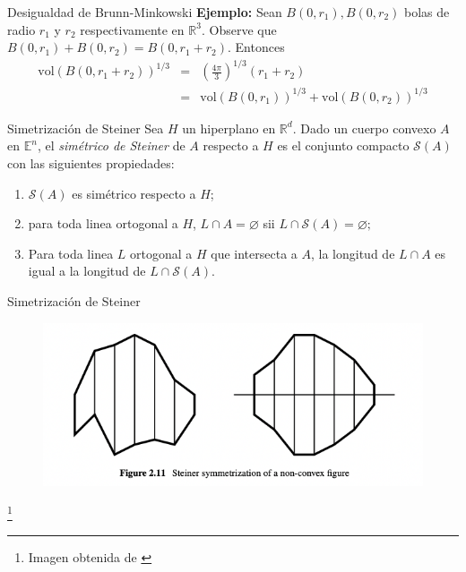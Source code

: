 \documentclass{beamer}
\newcommand\blfootnote[1]{%
  \begingroup
  \renewcommand\thefootnote{}\footnote{#1}%
  \addtocounter{footnote}{-1}%
  \endgroup
}
\newcommand{\vol}{\mathrm{vol}}
\begin{document}
\begin{frame}{Desigualdad de Brunn-Minkowski}
\textbf{Ejemplo:}
   Sean $B(0, r_1), B(0, r_2)$ bolas de radio $r_1$ y $r_2$ respectivamente en $\mathbb R^3.$ Observe que $B(0, r_1) +  B(0, r_2) = B(0, r_1 + r_2)$. Entonces
   \begin{eqnarray*}
       \vol(B(0, r_1 + r_2))^{1/3} &=& \left(\frac{4\pi}{3}\right)^{1/3} (r_1 + r_2) \\
       &=& \vol(B(0,r_1))^{1/3} + \vol(B(0, r_2))^{1/3}
   \end{eqnarray*}
   
\end{frame}

\begin{frame}{Simetrización de Steiner}
    Sea $H$ un hiperplano en $\mathbb R^d.$ Dado un cuerpo convexo $A$ en $\mathbb E^n$, el \textit{simétrico de Steiner} de $A$ respecto a $H$ es el conjunto compacto $\mathcal S(A)$ con las siguientes propiedades:
    \begin{enumerate}
        \item $\mathcal S(A)$ es simétrico respecto a $H$;
        \item para toda linea ortogonal a $H$, $L \cap A = \varnothing$ sii $L \cap \mathcal{S}(A) = \varnothing;$
        \item Para toda linea $L$ ortogonal a $H$ que intersecta a $A$, la longitud de $L \cap A$ es igual a la longitud de $L \cap \mathcal{S}(A).$
    \end{enumerate}
\end{frame}


\begin{frame}{Simetrización de Steiner}
    \begin{figure}
        \centering
        \includegraphics[scale=0.55]{pics/simetrizacion.png}
        \label{fig:my_label}
    \end{figure}
    \blfootnote{Imagen obtenida de \cite{book}}
\end{frame}
\end{document}
